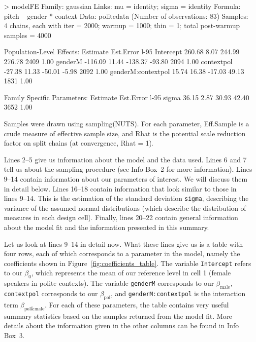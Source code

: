 \documentclass[nobib]{tufte-handout}
\begin{document}
\begin{minipage}[]{1.2\textwidth}
\begin{rc}
> modelFE
 Family: gaussian 
  Links: mu = identity; sigma = identity 
Formula: pitch ~ gender * context 
   Data: politedata (Number of observations: 83) 
Samples: 4 chains, each with iter = 2000; warmup = 1000; thin = 1;
         total post-warmup samples = 4000

Population-Level Effects: 
                   Estimate Est.Error l-95%
Intercept            260.68      8.07   244.99   276.78       2409 1.00
genderM             -116.09     11.44  -138.37   -93.80       2094 1.00
contextpol           -27.38     11.33   -50.01    -5.98       2092 1.00
genderM:contextpol    15.74     16.38   -17.03    49.13       1831 1.00

Family Specific Parameters: 
      Estimate Est.Error l-95%
sigma    36.15      2.87    30.93    42.40       3652 1.00

Samples were drawn using sampling(NUTS). For each parameter, Eff.Sample 
is a crude measure of effective sample size, and Rhat is the potential 
scale reduction factor on split chains (at convergence, Rhat = 1).
\end{rc}
\end{minipage}

Lines 2--5 give us information about the model and the data used. Lines 6 and 7 tell us about
the sampling procedure (see Info Box~2 for more information). Lines 9--14 contain information about our
parameters of interest. We will discuss them in detail below. Lines 16--18 contain information
that look similar to those in lines 9--14. This is the estimation of the standard deviation
\texttt{sigma}, describing the variance of the assumed normal distributions (which describe the
distribution of measures in each design cell). Finally, lines 20--22 contain general
information about the model fit and the information presented in this summary.

Let us look at lines 9--14 in detail now. What these lines give us is a table with four rows, each of which corresponds to a parameter in the model, namely the coefficients shown in Figure~\ref{fig:coefficients_table}. The variable \texttt{Intercept} refers to our $\beta_0$, which represents the mean of our reference level in cell 1 (female speakers in polite contexts). The variable \texttt{genderM} corresponds to our $\beta_{\text{male}}$, \texttt{contextpol} corresponds to our $\beta_{\text{pol}}$, and \texttt{genderM:contextpol} is the interaction term $\beta_{\text{pol\&male}}$. For each of these parameters, the table contains very useful summary statistics based on the samples returned from the model fit.
%
%
More details about the information given in the other columns can be found in Info Box~3.
\end{document}

